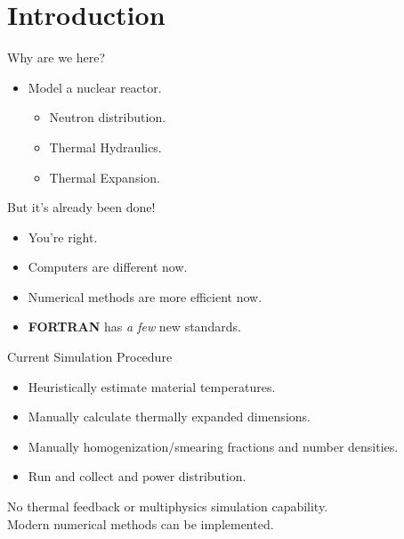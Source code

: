 \section{Introduction}
\label{sec:introduction}

\begin{frame}{Why are we here?}
  \begin{itemize}
    \item {\huge Model a nuclear reactor.}
      \pause
      \begin{itemize}
        \item Neutron distribution.
        \item Thermal Hydraulics.
        \item Thermal Expansion.
      \end{itemize}
  \end{itemize}
\end{frame}

\begin{frame}{But it's already been done!}
  \begin{itemize}
    \pause 
    \item You're right.
    \pause
    \item Computers are different now.
    \item Numerical methods are more efficient now.
    \item \textbf{FORTRAN} has \textit{a few} new standards.
  \end{itemize}
\end{frame}

\begin{frame}{Current Simulation Procedure}
  \begin{itemize}
    \item Heuristically estimate material temperatures.
    \item Manually calculate thermally expanded dimensions.
    \item Manually homogenization/smearing fractions and number densities.
    \item Run \dif and collect \keff and power distribution.
    \pause
  \end{itemize}
  \vspace{0.3in}
  \begin{block}{}
    \centering
    No thermal feedback or multiphysics simulation capability.\\
    Modern numerical methods can be implemented.
  \end{block}
\end{frame}

